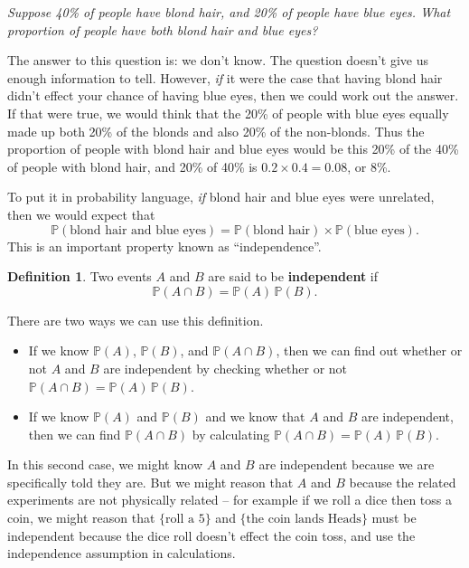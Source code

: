 \documentclass[
  a4paper,
]{book}
\providecommand{\tightlist}{%
  \setlength{\itemsep}{0pt}\setlength{\parskip}{0pt}}
\theoremstyle{definition}
\newtheorem{definition}{Definition}[chapter]
\theoremstyle{definition}
\theoremstyle{definition}
\theoremstyle{definition}
\theoremstyle{remark}
\begin{document}
\emph{Suppose 40\% of people have blond hair, and 20\% of people have blue eyes. What proportion of people have both blond hair and blue eyes?}

The answer to this question is: we don't know. The question doesn't give us enough information to tell. However, \emph{if} it were the case that having blond hair didn't effect your chance of having blue eyes, then we could work out the answer. If that were true, we would think that the 20\% of people with blue eyes equally made up both 20\% of the blonds and also 20\% of the non-blonds. Thus the proportion of people with blond hair and blue eyes would be this 20\% of the 40\% of people with blond hair, and 20\% of 40\% is \(0.2 \times 0.4 = 0.08\), or 8\%.

To put it in probability language, \emph{if} blond hair and blue eyes were unrelated, then we would expect that
\[ \mathbb P(\text{blond hair and blue eyes}) = \mathbb P(\text{blond hair}) \times \mathbb P(\text{blue eyes}) . \]
This is an important property known as ``independence''.

\begin{definition}
Two events \(A\) and \(B\) are said to be \textbf{independent} if
\[ \mathbb P(A \cap B) = \mathbb P(A)\, \mathbb P(B) .  \]
\end{definition}

There are two ways we can use this definition.

\begin{itemize}
\tightlist
\item
  If we know \(\mathbb P(A)\), \(\mathbb P(B)\), and \(\mathbb P(A \cap B)\), then we can find out whether or not \(A\) and \(B\) are independent by checking whether or not \(\mathbb P(A \cap B) = \mathbb P(A)\, \mathbb P(B)\).
\item
  If we know \(\mathbb P(A)\) and \(\mathbb P(B)\) and we know that \(A\) and \(B\) are independent, then we can find \(\mathbb P(A \cap B)\) by calculating \(\mathbb P(A \cap B) = \mathbb P(A)\, \mathbb P(B)\).
\end{itemize}

In this second case, we might know \(A\) and \(B\) are independent because we are specifically told they are. But we might reason that \(A\) and \(B\) because the related experiments are not physically related -- for example if we roll a dice then toss a coin, we might reason that \(\{\text{roll a 5}\}\) and \(\{\text{the coin lands Heads}\}\) must be independent because the dice roll doesn't effect the coin toss, and use the independence assumption in calculations.
\end{document}

